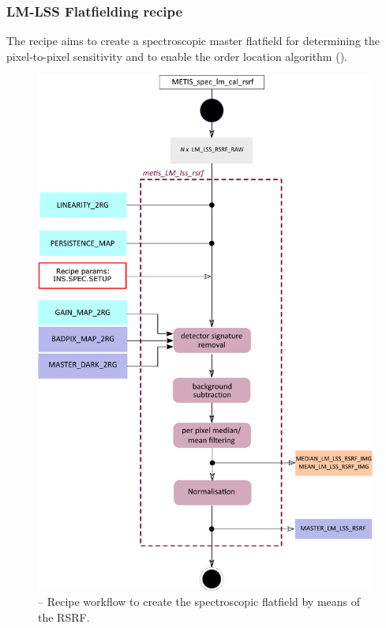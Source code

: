 \subsubsection{LM-LSS Flatfielding recipe }\label{rec:metis_lm_lss_rsrf}
The recipe \hyperref[rec:metis_lm_lss_rsrf]{} aims to create a spectroscopic master flatfield for determining the pixel-to-pixel sensitivity and to enable the order location algorithm (\hyperref[rec:metis_lm_lss_trace]{}).
\begin{figure}[ht]
  \centering
  \includegraphics[width=0.5\textheight]{figures/metis_lm_lss_rsrf_v0.83.pdf}
  \caption[Recipe: ]{ --
    Recipe workflow to create the spectroscopic flatfield by means of the \ac{RSRF}.}
  \label{Fig:rec_lm_lss_rsrf}
\end{figure}

